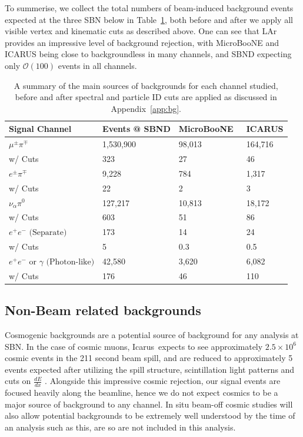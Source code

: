 \documentclass[11pt, a4paper]{article}
\newcommand{\refapp}[1]{Appendix~\ref{#1}}
\newcommand{\reftab}[1]{Table~\ref{#1}}
\def\muboone{MicroBooNE}
\def\icarus{Icarus}
\begin{document}
To summerise, we collect the total numbers of beam-induced background events
expected at the three SBN below in \reftab{tab:Rates}, both before and after we
apply all visible vertex and kinematic cuts as described above. One can see
that LAr provides an impressive level of background rejection, with \muboone
and ICARUS being close to backgroundless in many channels, and SBND expecting
only $\mathcal{O}(100)$ events in all channels.

\begin{table}[t]
\centering
\begin{tabular}{ l | l |  l | l |  }
	Signal Channel & Events @ SBND & \muboone\ & ICARUS \\
\hline\hline
$\mu^\pm \pi^\mp$ &  1,530,900  & 98,013 & 164,716\\
													  w/ Cuts &323 & 27 & 46 \\ \hline
$ e^\pm \pi^\mp$ &  9,228  & 784 & 1,317\\
													  w/ Cuts &22 & 2 & 3 \\ \hline
$ \nu_\alpha \pi^0$ &   127,217 & 10,813 & 18,172\\
													  w/ Cuts &603 & 51 & 86 \\ \hline
$ e^+e^- \text{ (Separate)} $ & 173 & 14 & 24\\
													  w/ Cuts &5 & 0.3 & 0.5\\ \hline
$ e^+ e^- \text{ or } \gamma \text{ (Photon-like)}$ &  42,580 & 3,620 & 6,082\\
													  w/ Cuts &176 & 46 & 110 \\ 
 \hline \hline

\end{tabular}

\caption{\label{tab:Rates} A summary of the main sources of backgrounds for
each channel studied, before and after spectral and particle ID cuts are
applied as discussed in \refapp{app:bg}. }

\end{table}


\subsection{Non-Beam related backgrounds}

Cosmogenic backgrounds are a potential source of background for any analysis at
SBN. In the case of cosmic muons, \icarus\ expects to see approximately $2.5
\times 10^{6}$ cosmic events in the 211 second beam spill, and are reduced to
approximately 5 events expected after utilizing the spill structure,
scintillation light patterns and cuts on $\frac{d E}{d x}$
\cite{Antonello:2015lea}.  Alongside this impressive cosmic rejection, our
signal events are focused heavily along the beamline, hence we do not expect
cosmics to be a major source of background to any channel. In situ beam-off
cosmic studies will also allow potential backgrounds to be extremely well
understood by the time of an analysis such as this, are so are not included in
this analysis. 
\end{document}
